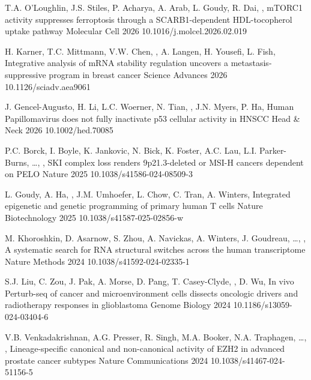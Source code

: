 %

\sectionList

  \pub
    {T.A. O'Loughlin, J.S. Stiles, P. Acharya, A. Arab, L. Goudy, R. Dai, \me, \etal}
    {mTORC1 activity suppresses ferroptosis through a SCARB1-dependent HDL-tocopherol uptake pathway}
    {Molecular Cell}
    {2026}
    {10.1016/j.molcel.2026.02.019}

  \pub
    {H. Karner, T.C. Mittmann, V.W. Chen, \me, A. Langen, H. Yousefi, L. Fish, \etal}
    {Integrative analysis of mRNA stability regulation uncovers a metastasis-suppressive program in breast cancer}
    {Science Advances}
    {2026}
    {10.1126/sciadv.aea9061}

  \pub
    {J. Gencel-Augusto, H. Li, L.C. Woerner, N. Tian, \me, J.N. Myers, P. Ha, \etal}
    {Human Papillomavirus does not fully inactivate p53 cellular activity in HNSCC}
    {Head \& Neck}
    {2026}
    {10.1002/hed.70085}

  \pub
    {P.C. Borck, I. Boyle, K. Jankovic, N. Bick, K. Foster, A.C. Lau, L.I. Parker-Burns, \ldots, \me, \etal}
    {SKI complex loss renders 9p21.3-deleted or MSI-H cancers dependent on PELO}
    {Nature}
    {2025}
    {10.1038/s41586-024-08509-3}

  \pub
    {L. Goudy, A. Ha, \me, J.M. Umhoefer, L. Chow, C. Tran, A. Winters, \etal}
    {Integrated epigenetic and genetic programming of primary human T cells}
    {Nature Biotechnology}
    {2025}
    {10.1038/s41587-025-02856-w}

  \pub
    {M. Khoroshkin, D. Asarnow, S. Zhou, A. Navickas, A. Winters, J. Goudreau, \ldots, \me, \etal}
    {A systematic search for RNA structural switches across the human transcriptome}
    {Nature Methods}
    {2024}
    {10.1038/s41592-024-02335-1}

  \pub
    {S.J. Liu, C. Zou, J. Pak, A. Morse, D. Pang, T. Casey-Clyde, \me, D. Wu, \etal}
    {In vivo Perturb-seq of cancer and microenvironment cells dissects oncologic drivers and radiotherapy responses in glioblastoma}
    {Genome Biology}
    {2024}
    {10.1186/s13059-024-03404-6}

  \pub
    {V.B. Venkadakrishnan, A.G. Presser, R. Singh, M.A. Booker, N.A. Traphagen, \ldots, \me, \etal}
    {Lineage-specific canonical and non-canonical activity of EZH2 in advanced prostate cancer subtypes}
    {Nature Communications}
    {2024}
    {10.1038/s41467-024-51156-5}

